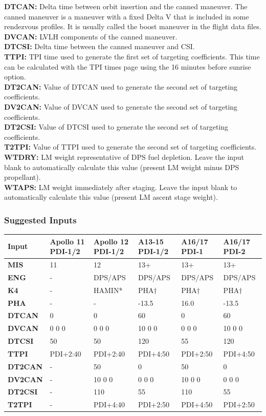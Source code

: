 \documentclass[11pt]{article} %
\begin{document}
\textbf{DTCAN:} Delta time between orbit insertion and the canned maneuver. The canned maneuver is a maneuver with a fixed Delta V that is included in some rendezvous profiles. It is usually called the boost maneuver in the flight data files.\\
\textbf{DVCAN:} LVLH components of the canned maneuver.\\
\textbf{DTCSI:} Delta time between the canned maneuver and CSI.\\
\textbf{TTPI:} TPI time used to generate the first set of targeting coefficients. This time can be calculated with the TPI times page using the 16 minutes before sunrise option.\\
\textbf{DT2CAN:} Value of DTCAN used to generate the second set of targeting coefficients.\\
\textbf{DV2CAN:} Value of DVCAN used to generate the second set of targeting coefficients.\\
\textbf{DT2CSI:} Value of DTCSI used to generate the second set of targeting coefficients.\\
\textbf{T2TPI:} Value of TTPI used to generate the second set of targeting coefficients.\\
\textbf{WTDRY:} LM weight representative of DPS fuel depletion. Leave the input blank to automatically calculate this value (present LM weight minus DPS propellant).\\
\textbf{WTAPS:} LM weight immediately after staging. Leave the input blank to automatically calculate this value (present LM ascent stage weight).\\
\subsubsection{Suggested Inputs}
\begin{tabular}{|m{2.0cm}|m{1.85cm}|m{1.85cm}|m{1.85cm}|m{1.85cm}|m{1.85cm}|}
  \hline
  \textbf{Input}&\textbf{Apollo 11 PDI-1/2}&\textbf{Apollo 12 PDI-1/2}&\textbf{A13-15 PDI-1/2}&\textbf{A16/17 PDI-1}&\textbf{A16/17 PDI-2}\\
	\hline
  \textbf{MIS}&11&12&13+&13+&13+\\
	\hline
  \textbf{ENG}&-&DPS/APS&DPS/APS&DPS/APS&DPS/APS\\
	\hline
	\textbf{K4}&-&HAMIN*&PHA$\dagger$&PHA$\dagger$&PHA$\dagger$\\
	\hline
	\textbf{PHA}&-&-&-13.5&16.0&-13.5\\
  \hline
	\textbf{DTCAN}&0&0&60&0&60\\
	\hline
	\textbf{DVCAN}&0 0 0&0 0 0&10 0 0&0 0 0&10 0 0\\
  \hline
	\textbf{DTCSI}&50&50&120&55&120\\
	\hline
	\textbf{TTPI}&PDI+2:40&PDI+2:40&PDI+4:50&PDI+2:50&PDI+4:50\\
	\hline
  \textbf{DT2CAN}&-&50&0&50&0\\
	\hline
  \textbf{DV2CAN}&-&10 0 0&0 0 0&10 0 0&0 0 0\\
  \hline
	\textbf{DT2CSI}&-&110&55&110&55\\
	\hline
	\textbf{T2TPI}&-&PDI+4:40&PDI+2:50&PDI+4:50&PDI+2:50\\
	\hline
\end{tabular}
\end{document}
